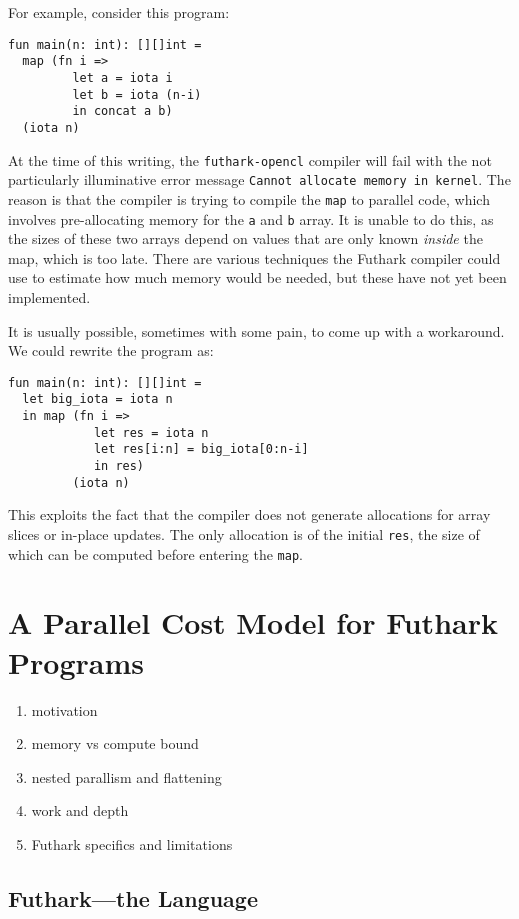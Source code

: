 \documentclass[11pt]{book}
\begin{document}
For example, consider this program:

\begin{lstlisting}
fun main(n: int): [][]int =
  map (fn i =>
         let a = iota i
         let b = iota (n-i)
         in concat a b)
  (iota n)
\end{lstlisting}

At the time of this writing, the \texttt{futhark-opencl} compiler will
fail with the not particularly illuminative error message
\texttt{Cannot allocate memory in kernel}.  The reason is that the
compiler is trying to compile the \texttt{map} to parallel code, which
involves pre-allocating memory for the \texttt{a} and \texttt{b}
array.  It is unable to do this, as the sizes of these two arrays
depend on values that are only known \textit{inside} the map, which is
too late.  There are various techniques the Futhark compiler could use
to estimate how much memory would be needed, but these have not yet
been implemented.

It is usually possible, sometimes with some pain, to come up with a
workaround.  We could rewrite the program as:

\begin{lstlisting}
fun main(n: int): [][]int =
  let big_iota = iota n
  in map (fn i =>
            let res = iota n
            let res[i:n] = big_iota[0:n-i]
            in res)
         (iota n)
\end{lstlisting}

This exploits the fact that the compiler does not generate allocations
for array slices or in-place updates.  The only allocation is of the
initial \texttt{res}, the size of which can be computed before
entering the \texttt{map}.

\chapter{A Parallel Cost Model for Futhark Programs}
\label{chap:costmodel}
\begin{enumerate}
\item motivation
\item memory vs compute bound
\item nested parallism and flattening
\item work and depth
\item Futhark specifics and limitations
\end{enumerate}

\section{Futhark---the Language}
\end{document}
